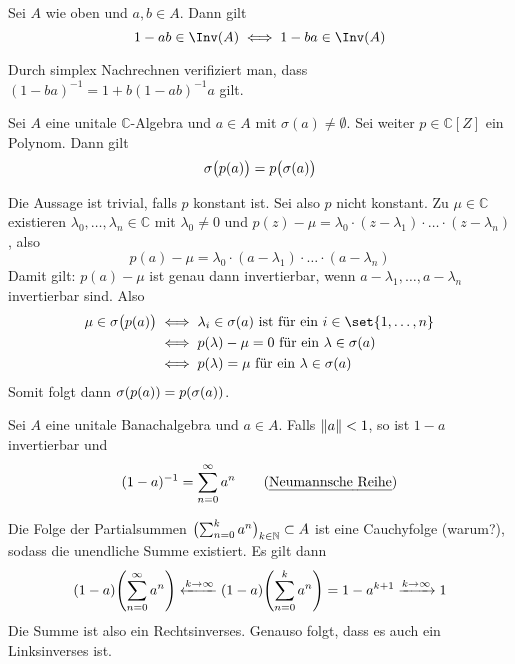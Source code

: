 \begin{bemerkung}
	Sei $A$ wie oben und $a,b \in A$. Dann gilt
	\[
		1 -ab \in \Inv(A) \iff 1 -ba \in \Inv(A)
	\]
\end{bemerkung}
\begin{beweis}
	Durch simplex Nachrechnen verifiziert man, dass $(1-ba)^{-1} = 1+ b(1- ab)^{-1} a$ gilt.
\end{beweis}

\begin{satz}
	Sei $A$ eine unitale $\mathds{C}$-Algebra und $a \in A$ mit $\sigma(a)\not= \emptyset$. Sei weiter $p \in \mathds{C}[Z]$ ein Polynom. Dann gilt 
	\[
		\sigma\enbrace[\big]{p(a) }= p \enbrace[\big]{\sigma(a)}
	\]
\end{satz}
\begin{beweis}
	Die Aussage ist trivial, falls $p$ konstant ist. Sei also $p$ nicht konstant. Zu $\mu \in \mathds{C}$ existieren $\lambda_0, \ldots , \lambda_n \in \mathds{C}$ mit 
	$\lambda_0 \not= 0$ und $p(z) -\mu = \lambda_0 \cdot (z- \lambda_1) \cdot  \ldots \cdot (z- \lambda_n)$, also
	\[
		p(a) - \mu = \lambda_0 \cdot (a-\lambda_1) \cdot  \ldots \cdot (a- \lambda_n)
	\]
	Damit gilt: $p(a) -\mu$ ist genau dann invertierbar, wenn $a -\lambda_1, \ldots , a-\lambda_n $ invertierbar sind. Also 
	\begin{align}
		\mu \in \sigma \enbrace[\big]{p(a)} &\iff \lambda_i \in \sigma(a) \text{ ist für ein } i \in \set{1,\ldots ,n} \\
		&\iff p(\lambda) -\mu =0 \text{ für ein } \lambda \in \sigma(a) \\
		&\iff p(\lambda)=\mu \text{ für ein } \lambda \in \sigma(a)   
	\end{align}
	Somit folgt dann $\sigma \enbrace*{p(a)} = p \enbrace*{\sigma(a)}$.
\end{beweis}

\begin{satz}[label=satz15_neumann]
	Sei $A$ eine unitale Banachalgebra und $a \in A$. Falls $\norm{a}<1$, so ist $1-a$ invertierbar und 
	\[
		(1-a)^{-1} = \sum_{n=0}^{\infty} a^n \tag*{(\Index{Neumannsche Reihe})}
	\]
\end{satz}
\begin{beweis}
	Die Folge der Partialsummen $\enbrace[\big]{\sum_{n=0}^{k} a^n}_{k \in \mathds{N}} \subset A$ ist eine Cauchyfolge (warum?), sodass die unendliche Summe existiert. Es gilt dann
	\begin{align}
		(1-a) \enbrace*{\sum_{n=0}^{\infty} a^n} \xleftarrow{k \to \infty}(1-a) \enbrace*{\sum_{n=0}^{k} a^n} = 1-a^{k+1} \xrightarrow{k \to \infty} 1
	\end{align}
	Die Summe ist also ein Rechtsinverses. Genauso folgt, dass es auch ein Linksinverses ist.
\end{beweis}

